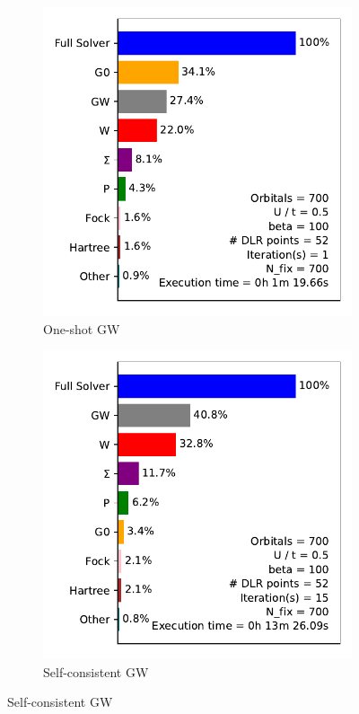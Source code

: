 \documentclass[12pt]{article}
\begin{document}
\begin{figure}[h!]
  \centering
  \begin{subfigure}[b]{0.4\textwidth}
    \includegraphics[width=\textwidth]{os.pdf}
    \caption{One-shot GW}
  \end{subfigure}
  \hspace{0.02\textwidth}
  \begin{subfigure}[b]{0.4\textwidth}
    \includegraphics[width=\textwidth]{sc.pdf}
    \caption{Self-consistent GW}
  \end{subfigure}
\end{figure}\\
\newpage
\noindent
\end{document}
